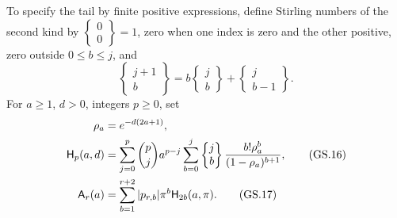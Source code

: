 To specify the tail by finite positive expressions, define Stirling
numbers of the second kind by
$\left\{\begin{smallmatrix}0\\0\end{smallmatrix}\right\}=1$,
zero when one index is zero and the other positive, zero outside
$0\le b\le j$, and
\[
 \left\{\begin{matrix}j+1\\b\end{matrix}\right\}
 =b\left\{\begin{matrix}j\\b\end{matrix}\right\}
  +\left\{\begin{matrix}j\\b-1\end{matrix}\right\}.
\]
For $a\ge1$, $d>0$, integers $p\ge0$, set
\begin{align}
 \rho_a&=e^{-d(2a+1)},\notag\\
 \mathsf H_p(a,d)&=\sum_{j=0}^p\binom pj a^{p-j}
 \sum_{b=0}^j\left\{\begin{matrix}j\\b\end{matrix}\right\}
       \frac{b!\rho_a^b}{(1-\rho_a)^{b+1}},\tag{GS.16}\\
 \mathsf A_r(a)&=\sum_{b=1}^{r+2}|p_{r,b}|\pi^b
                         \mathsf H_{2b}(a,\pi).\tag{GS.17}
\end{align}

